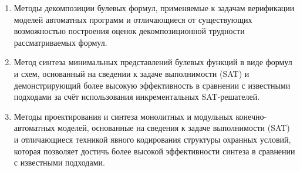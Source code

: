 %
\begin{enumerate}[beginpenalty=10000]
    \item Методы декомпозиции булевых формул, применяемые к задачам верификации моделей автоматных программ и отличающиеся от существующих возможностью построения оценок декомпозиционной трудности рассматриваемых формул.

    \item Метод синтеза минимальных представлений булевых функций в виде формул и схем, основанный на сведении к задаче выполнимости (SAT) и демонстрирующий более высокую эффективность в сравнении с известными подходами за счёт использования инкрементальных SAT-решателей.

    \item Методы проектирования и синтеза монолитных и модульных конечно-автоматных моделей, основанные на сведения к задаче выполнимости (SAT) и отличающиеся техникой явного кодирования структуры охранных условий, которая позволяет достичь более высокой эффективности синтеза в сравнении с известными подходами.


\end{enumerate}
